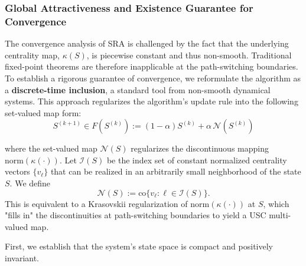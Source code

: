 \documentclass[journal]{IEEEtran}
\begin{document}
\subsubsection{Global Attractiveness and Existence Guarantee for Convergence}
\label{subsec:attractivity}

The convergence analysis of SRA is challenged by the fact that the underlying centrality map, $\kappa(S)$, is piecewise constant and thus non-smooth. Traditional fixed-point theorems are therefore inapplicable at the path-switching boundaries. To establish a rigorous guarantee of convergence, we reformulate the algorithm as a \textbf{discrete-time inclusion}, a standard tool from non-smooth dynamical systems. This approach regularizes the algorithm's update rule into the following set-valued map form:
\begin{equation}\label{eq:inclusion_map}
S^{(k+1)} \in F(S^{(k)}) := (1-\alpha)S^{(k)}+\alpha\,\mathcal{N}(S^{(k)})
\end{equation}

where the set-valued map $\mathcal{N}(S)$ regularizes the discontinuous mapping $\mathrm{norm}(\kappa(\cdot))$.
Let $\mathcal{I}(S)$ be the index set of constant normalized centrality vectors $\{v_\ell\}$ that can be realized in an arbitrarily small neighborhood of the state $S$. We define
\begin{equation}
    \mathcal{N}(S) := \mathrm{co}\{v_\ell : \ell \in \mathcal{I}(S)\}.
\end{equation}
This is equivalent to a Krasovskii regularization of $\mathrm{norm}(\kappa(\cdot))$ at $S$, which "fills in" the discontinuities at path-switching boundaries to yield a USC multi-valued map.

First, we establish that the system's state space is compact and positively invariant.
\end{document}
